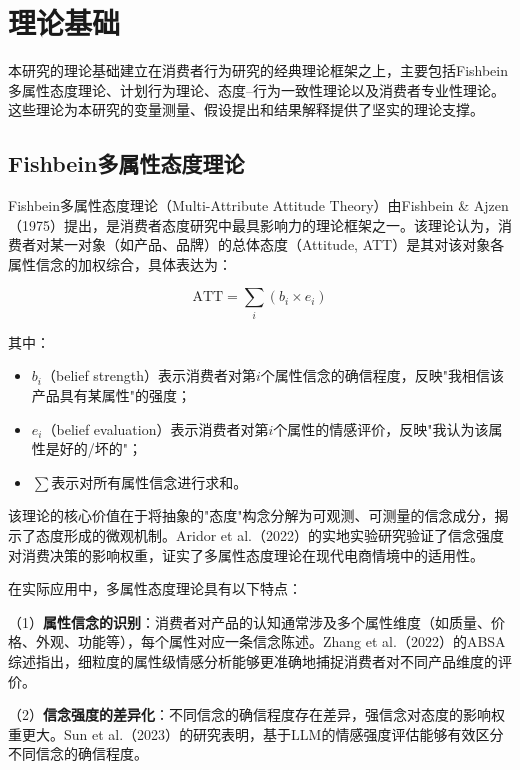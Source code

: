\section{理论基础}

本研究的理论基础建立在消费者行为研究的经典理论框架之上，主要包括Fishbein多属性态度理论、计划行为理论、态度--行为一致性理论以及消费者专业性理论。这些理论为本研究的变量测量、假设提出和结果解释提供了坚实的理论支撑。

\subsection{Fishbein多属性态度理论}

Fishbein多属性态度理论（Multi-Attribute Attitude Theory）由Fishbein \& Ajzen（1975）\cite{fishbein1975}提出，是消费者态度研究中最具影响力的理论框架之一。该理论认为，消费者对某一对象（如产品、品牌）的总体态度（Attitude, ATT）是其对该对象各属性信念的加权综合，具体表达为：

\begin{equation}
\text{ATT} = \sum_{i} (b_i \times e_i)
\label{eq:att}
\end{equation}

其中：
\begin{itemize}
  \item $b_i$（belief strength）表示消费者对第$i$个属性信念的确信程度，反映"我相信该产品具有某属性"的强度；
  \item $e_i$（belief evaluation）表示消费者对第$i$个属性的情感评价，反映"我认为该属性是好的/坏的"；
  \item $\sum$表示对所有属性信念进行求和。
\end{itemize}

该理论的核心价值在于将抽象的"态度"构念分解为可观测、可测量的信念成分，揭示了态度形成的微观机制。Aridor et al.（2022）\cite{aridor2022}的实地实验研究验证了信念强度对消费决策的影响权重，证实了多属性态度理论在现代电商情境中的适用性。

在实际应用中，多属性态度理论具有以下特点：

（1）\textbf{属性信念的识别}：消费者对产品的认知通常涉及多个属性维度（如质量、价格、外观、功能等），每个属性对应一条信念陈述。Zhang et al.（2022）\cite{zhang2022absa}的ABSA综述指出，细粒度的属性级情感分析能够更准确地捕捉消费者对不同产品维度的评价。

（2）\textbf{信念强度的差异化}：不同信念的确信程度存在差异，强信念对态度的影响权重更大。Sun et al.（2023）\cite{sun2023}的研究表明，基于LLM的情感强度评估能够有效区分不同信念的确信程度。


